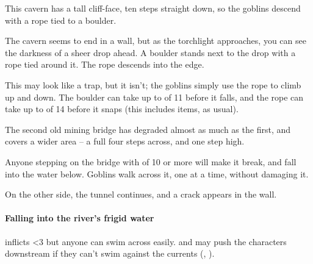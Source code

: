 \begin{multicols}{2}

\begin{exampletext}
  This cavern has a tall cliff-face, ten \glspl{step} straight down, so the goblins descend with a rope tied to a boulder.
\end{exampletext}

\begin{boxtext}
  The cavern seems to end in a wall, but as the torchlight approaches, you can see the darkness of a sheer drop ahead.
  A boulder stands next to the drop with a rope tied around it.
  The rope descends into the edge.
\end{boxtext}

This may look like a trap, but it isn't; the goblins simply use the rope to climb up and down.
The boulder can take up to  of 11 before it falls, and the rope can take up to  of 14 before it snaps (this includes items, as usual).




\begin{exampletext}
  The second old mining bridge has degraded almost as much as the first, and covers a wider area -- a full four \glspl{step} across, and one \gls{step} high.
\end{exampletext}

Anyone stepping on the bridge with  of 10 or more will make it break, and fall into the water below.
Goblins walk across it, one at a time, without damaging it.

On the other side, the tunnel continues, and a crack appears in the wall.


\paragraph{Falling into the river's frigid water}
inflicts 
\ifnum\value{temperature}<3%
  but anyone can swim across easily.
\else%
  and may push the characters downstream if they can't swim against the currents (, \tn[5]).
\fi%



\end{multicols}
